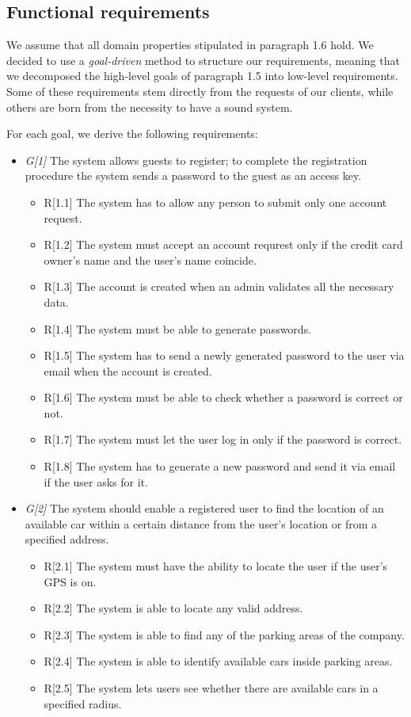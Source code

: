 
\subsection{Functional requirements}
We assume that all domain properties stipulated in paragraph 1.6 hold. We decided to use a \textit{goal-driven} method to structure our requirements, meaning that we decomposed the high-level goals of paragraph 1.5 into low-level requirements.
Some of these requirements stem directly from the requests of our clients, while others are born from the necessity to have a sound system.

For each goal, we derive the following requirements:



\begin{itemize}


				\item \textit{G[1]} The system allows guests to register; to complete the registration procedure the system sends a password to the guest as an access key.
					\begin{itemize}
						\item R[1.1] The system has to allow any person to submit only one account request.
						\item R[1.2] The system must accept an account requrest only if the credit card owner's name and the user's name coincide.
						\item R[1.3] The account is created when an admin validates all the necessary data.
						\item R[1.4] The system must be able to generate passwords.
						\item R[1.5] The system has to send a newly generated password to the user via email when the account is created.
						\item R[1.6] The system must be able to check whether a password is correct or not.
						\item R[1.7] The system must let the user log in only if the password is correct. 
						\item R[1.8] The system has to generate a new password and send it via email if the user asks for it.
					\end{itemize}

				\item \textit{G[2]} The system should enable a registered user to find the location of an available car within a certain distance from the user's location or from a specified address.
					\begin{itemize}
						\item R[2.1] The system must have the ability to locate the user if the user's GPS is on.
						\item R[2.2] The system is able to locate any valid address.
						\item R[2.3] The system is able to find any of the parking areas of the company. 
						\item R[2.4] The system is able to identify available cars inside parking areas.
						\item R[2.5] The system lets users see whether there are available cars in a specified radius. %
					\end{itemize}
					

\end{itemize}
